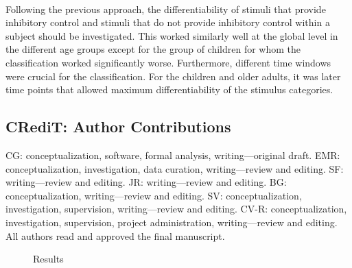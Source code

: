 \\

Following the previous approach, the differentiability of stimuli that provide inhibitory control and stimuli that do not provide inhibitory control within a subject should be investigated. This worked similarly well at the global level in the different age groups except for the group of children for whom the classification worked significantly worse. Furthermore, different time windows were crucial for the classification. For the children and older adults, it was later time points that allowed maximum differentiability of the stimulus categories. 

\subsection*{CRediT: Author Contributions}
CG: conceptualization, software, formal analysis, writing—original draft. 
EMR: conceptualization, investigation, data curation, writing—review and editing.
SF: writing—review and editing. JR: writing—review and editing. 
BG: conceptualization, writing—review and editing. 
SV: conceptualization, investigation, supervision, writing—review and editing. 
CV-R: conceptualization, investigation, supervision, project administration, writing—review and editing. 
All authors read and approved the final manuscript.

\begin{figure}[h]
\begin{center}

\caption[Reuslts]{Results}
\label{fig:DSI_exp1}
\end{center}
\end{figure}